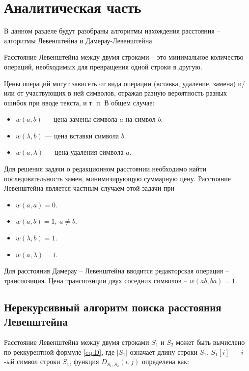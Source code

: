 \chapter{Аналитическая часть}

В данном разделе будут разобраны алгоритмы нахождения расстояния --
алгоритмы Левенштейна и Дамерау-Левенштейна.

Расстояние Левенштейна между двумя строками -- это минимальное количество операций, необходимых для превращения одной строки в другую.

Цены операций могут зависеть от вида операции (вставка, удаление, замена) и/или от участвующих в ней символов, отражая разную вероятность разных ошибок при вводе текста, и т. п. В общем случае:

\begin{itemize}
	\item $w(a,b)$ — цена замены символа $a$ на символ $b$.
	\item $w(\lambda,b)$ — цена вставки символа $b$.
	\item $w(a,\lambda)$ — цена удаления символа $a$.
\end{itemize}

Для решения задачи о редакционном расстоянии необходимо найти последовательность замен, минимизирующую суммарную цену. Расстояние Левенштейна является частным случаем этой задачи при

\begin{itemize}
	\item $w(a,a)=0$.
	\item $w(a,b)=1, \medspace a \neq b$.
	\item $w(\lambda,b)=1$.
	\item $w(a,\lambda)=1$.
\end{itemize}

Для расстояния Дамерау -- Левенштейна вводится редакторская операция --
транспозиция. Цена транспозиции двух соседних символов -- $w(ab,ba)=1$.

\section{Нерекурсивный алгоритм поиска расстояния Левенштейна}

Расстояние Левенштейна между двумя строками $S_1$ и $S_2$ может быть вычислено по реккурентной формуле \ref{eq:D}, где $|S_1|$ означает длину строки $S_1$, $S_1[i]$ — $i$-ый символ строки $S_1$, функция $D_{S_1, S_2}(i, j)$ определена как:

